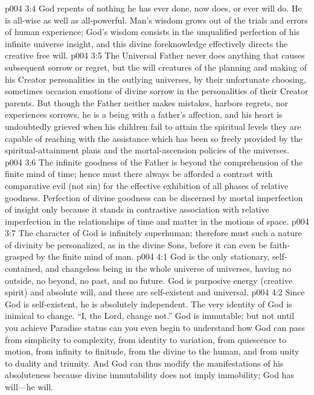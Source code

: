 \pc \vs p004 3:4 God repents of nothing he has ever done, now does, or ever will do. He is all\hyp{}wise as well as all\hyp{}powerful. Man’s wisdom grows out of the trials and errors of human experience; God’s wisdom consists in the unqualified perfection of his infinite universe insight, and this divine foreknowledge effectively directs the creative free will.\plusone
\vs p004 3:5 The Universal Father never does anything that causes subsequent sorrow or regret, but the will creatures of the planning and making of his Creator personalities in the outlying universes, by their unfortunate choosing, sometimes occasion emotions of divine sorrow in the personalities of their Creator parents. But though the Father neither makes mistakes, harbors regrets, nor experiences sorrows, he is a being with a father’s affection, and his heart is undoubtedly grieved when his children fail to attain the spiritual levels they are capable of reaching with the assistance which has been so freely provided by the spiritual\hyp{}attainment plans and the mortal\hyp{}ascension policies of the universes.
\vs p004 3:6 The infinite goodness of the Father is beyond the comprehension of the finite mind of time; hence must there always be afforded a contrast with comparative evil (not sin) for the effective exhibition of all phases of relative goodness. Perfection of divine goodness can be discerned by mortal imperfection of insight only because it stands in contrastive association with relative imperfection in the relationships of time and matter in the motions of space.
\vs p004 3:7 The character of God is infinitely superhuman; therefore must such a nature of divinity be personalized, as in the divine Sons, before it can even be faith\hyp{}grasped by the finite mind of man.
\vs p004 4:1 God is the only stationary, self\hyp{}contained, and changeless being in the whole universe of universes, having no outside, no beyond, no past, and no future. God is purposive energy (creative spirit) and absolute will, and these are self\hyp{}existent and universal.
\vs p004 4:2 Since God is self\hyp{}existent, he is absolutely independent. The very identity of God is inimical to change. “I, the Lord, change not.” God is immutable; but not until you achieve Paradise status can you even begin to understand how God can pass from simplicity to complexity, from identity to variation, from quiescence to motion, from infinity to finitude, from the divine to the human, and from unity to duality and triunity. And God can thus modify the manifestations of his absoluteness because divine immutability does not imply immobility; God has will---he  will.
